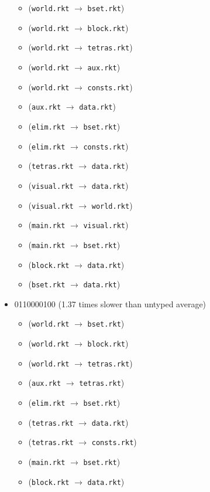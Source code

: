 \documentclass{article}
\newcommand{\mono}[1]{\texttt{#1}}
\begin{document}
\begin{itemize}
  \begin{itemize}
  \item (\mono{world.rkt} $\rightarrow$ \mono{bset.rkt})
  \item (\mono{world.rkt} $\rightarrow$ \mono{block.rkt})
  \item (\mono{world.rkt} $\rightarrow$ \mono{tetras.rkt})
  \item (\mono{world.rkt} $\rightarrow$ \mono{aux.rkt})
  \item (\mono{world.rkt} $\rightarrow$ \mono{consts.rkt})
  \item (\mono{aux.rkt} $\rightarrow$ \mono{data.rkt})
  \item (\mono{elim.rkt} $\rightarrow$ \mono{bset.rkt})
  \item (\mono{elim.rkt} $\rightarrow$ \mono{consts.rkt})
  \item (\mono{tetras.rkt} $\rightarrow$ \mono{data.rkt})
  \item (\mono{visual.rkt} $\rightarrow$ \mono{data.rkt})
  \item (\mono{visual.rkt} $\rightarrow$ \mono{world.rkt})
  \item (\mono{main.rkt} $\rightarrow$ \mono{visual.rkt})
  \item (\mono{main.rkt} $\rightarrow$ \mono{bset.rkt})
  \item (\mono{block.rkt} $\rightarrow$ \mono{data.rkt})
  \item (\mono{bset.rkt} $\rightarrow$ \mono{data.rkt})
  \end{itemize}
\item 0110000100 (1.37 times slower than untyped average)
  \begin{itemize}
  \item (\mono{world.rkt} $\rightarrow$ \mono{bset.rkt})
  \item (\mono{world.rkt} $\rightarrow$ \mono{block.rkt})
  \item (\mono{world.rkt} $\rightarrow$ \mono{tetras.rkt})
  \item (\mono{aux.rkt} $\rightarrow$ \mono{tetras.rkt})
  \item (\mono{elim.rkt} $\rightarrow$ \mono{bset.rkt})
  \item (\mono{tetras.rkt} $\rightarrow$ \mono{data.rkt})
  \item (\mono{tetras.rkt} $\rightarrow$ \mono{consts.rkt})
  \item (\mono{main.rkt} $\rightarrow$ \mono{bset.rkt})
  \item (\mono{block.rkt} $\rightarrow$ \mono{data.rkt})

\end{itemize}
\end{itemize}
\end{document}
